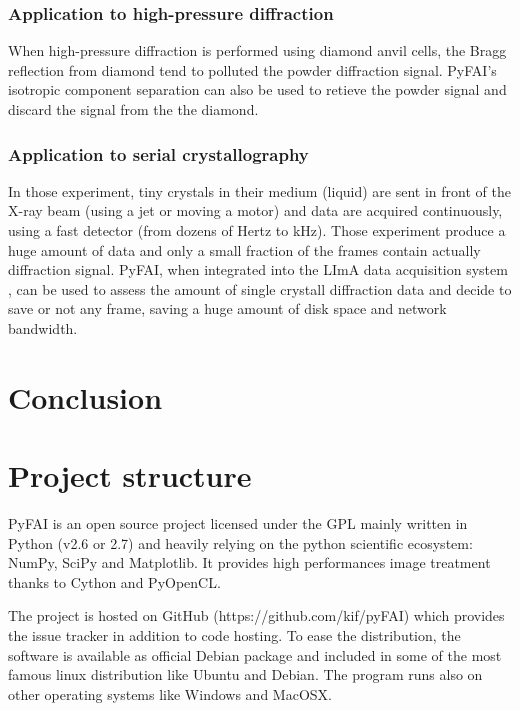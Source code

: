 \documentclass[preprint]{iucr}
\begin{document}
\subsubsection{Application to high-pressure diffraction}
When high-pressure diffraction is performed using diamond anvil cells, the Bragg
reflection from diamond tend to polluted the powder diffraction signal. PyFAI's
isotropic component separation can also be used to retieve the powder signal and
discard the signal from the the diamond.

\subsubsection{Application to serial crystallography}
In those experiment, tiny crystals in their medium (liquid) are sent in front of
the X-ray beam (using a jet or moving a motor) and data are acquired
continuously, using a fast detector (from dozens of Hertz to kHz).
Those experiment produce a huge amount of data and only a small fraction of the
frames contain actually diffraction signal.
PyFAI, when integrated into the LImA data acquisition system \cite{lima},
can be used to assess the amount of single crystall diffraction data and decide
to save or not any frame, saving a huge amount of disk space and network
bandwidth.



\section{Conclusion}






\appendix
\section{Project structure}
PyFAI is an open source project licensed under the GPL mainly written in Python (v2.6 or 2.7)
and heavily relying on the python scientific ecosystem: NumPy, SciPy and Matplotlib.
It provides high performances image treatment thanks to Cython and PyOpenCL.

The project is hosted on GitHub (https://github.com/kif/pyFAI) which provides
the issue tracker in addition to code hosting.
To ease the distribution, the
software is available as official Debian package and included in some of the
most famous linux distribution like Ubuntu and Debian.
The program runs also on other operating systems like Windows and MacOSX.
\end{document}
